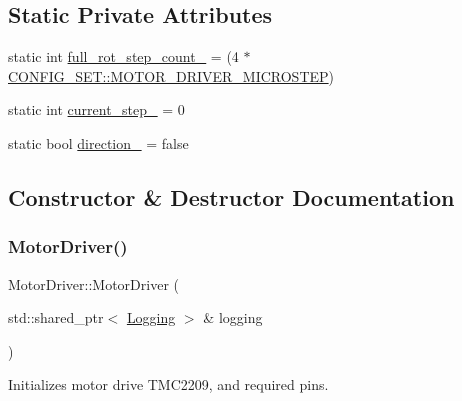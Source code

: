 \subsection*{Static Private Attributes}
\begin{DoxyCompactItemize}
\item 
static int \hyperlink{classMotorDriver_ab49b3ca9359af0016c206960887349b1}{full\+\_\+rot\+\_\+step\+\_\+count\+\_\+} = (4 $\ast$ \hyperlink{namespaceCONFIG__SET_a7028034ed96d5ef10a87d1cdc12c5d27}{C\+O\+N\+F\+I\+G\+\_\+\+S\+E\+T\+::\+M\+O\+T\+O\+R\+\_\+\+D\+R\+I\+V\+E\+R\+\_\+\+M\+I\+C\+R\+O\+S\+T\+EP})
\item 
static int \hyperlink{classMotorDriver_a9072fc26381b16a6a5e39ab1d7ed1e46}{current\+\_\+step\+\_\+} = 0
\item 
static bool \hyperlink{classMotorDriver_a09cb1d904ff0b9ce54f17fa54aec8c70}{direction\+\_\+} = false
\end{DoxyCompactItemize}


\subsection{Constructor \& Destructor Documentation}
\mbox{\label{classMotorDriver_ac03c1c5c2ac455e46fe196881641b366}} 
\subsubsection{\texorpdfstring{Motor\+Driver()}{MotorDriver()}\hspace{0.1cm}{\footnotesize\ttfamily [1/2]}}
{\footnotesize\ttfamily Motor\+Driver\+::\+Motor\+Driver (\begin{DoxyParamCaption}\item[{std\+::shared\+\_\+ptr$<$ \hyperlink{classLogging}{Logging} $>$ \&}]{logging }\end{DoxyParamCaption})}



Initializes motor drive T\+M\+C2209, and required pins. 

\mbox{\label{classMotorDriver_a534f4ca22b5dcffc9e40aafef09c76e5}} 

